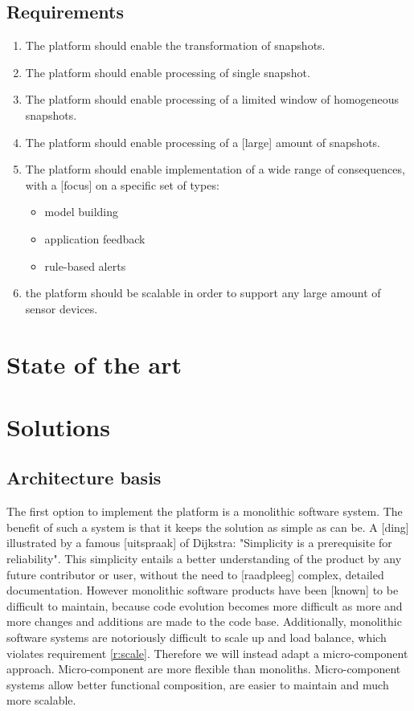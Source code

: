\subsection{Requirements}
\begin{enumerate}[label=V\archid .\arabic*]
\nospace
\item \label{r:snaptshot_transformation} The platform should enable the transformation of snapshots.
\item \label{r:basis_single} The platform should enable processing of single snapshot.
\item \label{r:basis_historic} The platform should enable processing of a limited window of homogeneous snapshots.
\item \label{r:basis_accumulated} The platform should enable processing of a [large] amount of snapshots.
\item \label{r:consequence} The platform should enable implementation of a wide range of consequences, with a [focus] on a specific set of types:
\begin{itemize}
\nospace
\item model building
\item application feedback
\item rule-based alerts
\end{itemize}
\item \label{r:scale} the platform should be scalable in order to support any large amount of sensor devices.
\end{enumerate}

\section{State of the art}
\section{Solutions}
\subsection{Architecture basis}
The first option to implement the platform is a monolithic software system. The benefit of such a system is that it keeps the solution as simple as can be. A [ding] illustrated by a famous [uitspraak] of Dijkstra: "Simplicity is a prerequisite for reliability"\cite{zoeken}. This simplicity entails a better understanding of the product by any future contributor or user, without the need to [raadpleeg] complex, detailed documentation. However monolithic software products have been [known] to be difficult to maintain, because code evolution becomes more difficult as more and more changes and additions are made to the code base\cite{TODO:find}. Additionally, monolithic software systems are notoriously difficult to scale up and load balance\cite{TODO:find}, which violates requirement \ref{r:scale}. Therefore we will instead adapt a micro-component approach. Micro-component are  more flexible than monoliths. Micro-component systems allow better functional composition, are easier to maintain and much more scalable\cite{TODO:find}.

